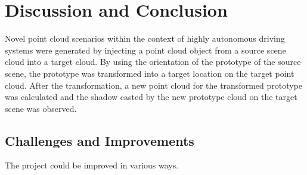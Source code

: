\chapter{Discussion and Conclusion}
Novel point cloud scenarios within the context of highly autonomous driving systems were generated by injecting a point cloud object from a source scene cloud into a target cloud. By using the orientation of the prototype of the source scene, the prototype was transformed into a target location on the target point cloud. After the transformation, a new point cloud for the transformed prototype was calculated and the shadow casted by the new prototype cloud on the target scene was observed.
\section{Challenges and Improvements}
The project could be improved in various ways.
